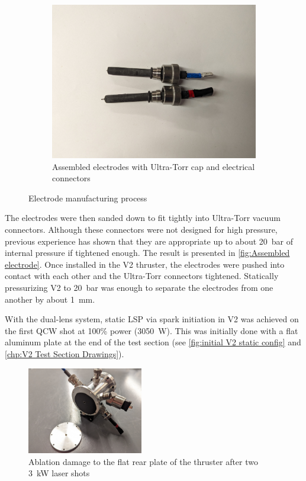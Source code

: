 \begin{figure}[!ht]
\begin{subfigure}[t]{0.30\textwidth}
        \centering
        \includegraphics[width=\textwidth]{assets/3 design/V2 electrodes.jpg}
        \caption{Assembled electrodes with Ultra-Torr cap and electrical connectors}
        \label{fig:Assembled electrode}
    \end{subfigure}

    \caption{Electrode manufacturing process}
\end{figure}

The electrodes were then sanded down to fit tightly into Ultra-Torr vacuum connectors. Although these connectors were not designed for high pressure, previous experience has shown that they are appropriate up to about \qty{20}{bar} of internal pressure if tightened enough. The result is presented in \autoref{fig:Assembled electrode}. Once installed in the V2 thruster, the electrodes were pushed into contact with each other and the Ultra-Torr connectors tightened. Statically pressurizing V2 to \qty{20}{bar} was enough to separate the electrodes from one another by about \qty{1}{mm}.

With the dual-lens system, static LSP via spark initiation in V2 was achieved on the first QCW shot at 100\% power (\qty{3050}{W}). This was initially done with a flat aluminum plate at the end of the test section (see \autoref{fig:initial V2 static config} and \autoref{chp:V2 Test Section Drawings}). 

\begin{figure}[!ht]
    \centering
    \includegraphics[width=0.45\textwidth]{assets/4 experiments/V2 test damage.jpg}
    \caption{Ablation damage to the flat rear plate of the thruster after two \qty{3}{kW} laser shots}
    \label{fig:initial V2 static config}
\end{figure}

